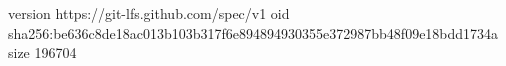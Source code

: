 version https://git-lfs.github.com/spec/v1
oid sha256:be636c8de18ac013b103b317f6e894894930355e372987bb48f09e18bdd1734a
size 196704
